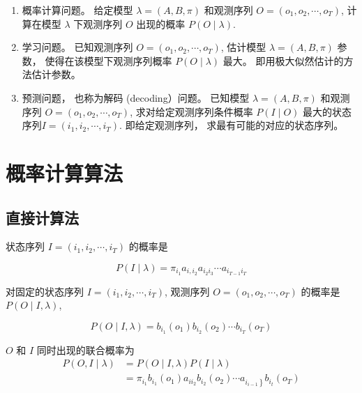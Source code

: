 \begin{enumerate}
    \item 概率计算问题。 给定模型 $ \lambda=(A, B, \pi) $ 和观测序列 $ O=\left(o_{1}, o_{2}, \cdots, o_{T}\right) $, 计 算在模型 $ \lambda $ 下观测序列 $ O $ 出现的概率 $ P(O \mid \lambda) $.
    \item 学习问题。 已知观测序列 $ O=\left(o_{1}, o_{2}, \cdots, o_{T}\right) $, 估计模型 $ \lambda=(A, B, \pi) $ 参数， 使得在该模型下观测序列概率 $ P(O \mid \lambda) $ 最大。 即用极大似然估计的方法估计参数。
    \item 预测问题， 也称为解码 (decoding）问题。 已知模型 $ \lambda=(A, B, \pi) $ 和观测 序列 $ O=\left(o_{1}, o_{2}, \cdots, o_{T}\right) $, 求对给定观测序列条件概率 $ P(I \mid O) $ 最大的状态序列$ I=\left(i_{1}, i_{2}, \cdots, i_{T}\right) $. 即给定观测序列， 求最有可能的对应的状态序列。
\end{enumerate}

\section{概率计算算法}

\subsection{直接计算法}

状态序列 $ I=\left(i_{1}, i_{2}, \cdots, i_{T}\right) $ 的概率是

\begin{equation} P(I \mid \lambda)=\pi_{i_{1}} a_{i, i_{2}} a_{i_{2} i_{3}} \cdots a_{i_{T-1} i_{T}} \end{equation}


对固定的状态序列 $ I=\left(i_{1}, i_{2}, \cdots, i_{T}\right) $, 观测序列 $ O=\left(o_{1}, o_{2}, \cdots, o_{T}\right) $ 的概率是 $ P(O \mid I, \lambda) $,

\begin{equation} P(O \mid I, \lambda)=b_{i_{1}}\left(o_{1}\right) b_{i_{2}}\left(o_{2}\right) \cdots b_{i_{T}}\left(o_{T}\right) \end{equation}

$ O $ 和 $ I $ 同时出现的联合概率为
\begin{equation} 
\begin{aligned}
    P(O, I \mid \lambda)&=P(O \mid I, \lambda) P(I \mid \lambda)\\
    &=\pi_{i_{1}} b_{i_{1}}\left(o_{1}\right) a_{i i_{2}} b_{i_{2}}\left(o_{2}\right) \cdots a_{\left.i_{i-1}\right\}} b_{i_{t}}\left(o_{T}\right)
\end{aligned}
\end{equation}

